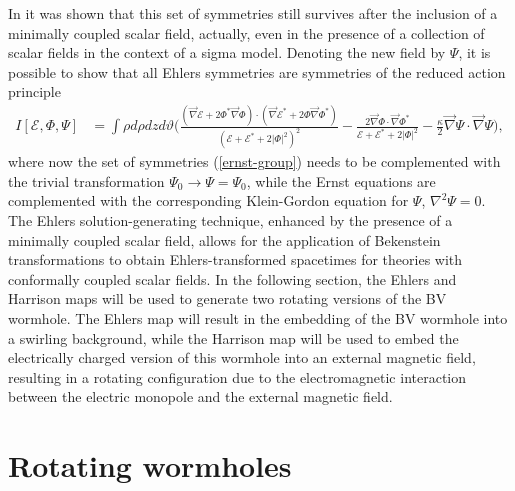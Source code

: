 \documentclass[aps,preprint,groupedaddress,nofootinbib,superscriptaddress,showkeys,showpacs,eqsecnum,amsmath,amssymb]{revtex4-1}
\newcommand{\ernst}{\mathcal{E}}
\begin{document}
In \cite{Astorino:2013xc} it was shown that this set of symmetries still survives after the inclusion of a minimally coupled scalar field, actually, even in the presence of a collection of scalar fields in the context of a sigma model. Denoting the new field by $\Psi$, it is possible to show that all Ehlers symmetries are symmetries of the reduced action principle 
\begin{align}
I[\ernst,\Phi,\Psi] &= \int \rho d\rho dz d\vartheta \Biggl(\frac{(\vec{\nabla}\ernst + 2 \Phi^{*} \vec{\nabla} \Phi ) \cdot (\vec{\nabla}\ernst^{*} + 2 \Phi \vec{\nabla} \Phi^{*} )}{(\ernst+ \ernst^{*} + 2 |\Phi|^2)^2}-\frac{2 \vec{\nabla}\Phi \cdot \vec{\nabla}\Phi^{*}}{\ernst + \ernst^{*} + 2 |\Phi|^2} -\frac{\kappa}{2} \vec{\nabla}\Psi \cdot \vec{\nabla} \Psi \Biggr) , \label{maxw-GR+MinScl-action}
\end{align}
where now the set of symmetries (\ref{ernst-group}) needs to be complemented with the trivial transformation $\Psi_0\rightarrow\Psi=\Psi_0$, while the Ernst equations are complemented with the corresponding Klein-Gordon equation for $\Psi$, $\nabla^2\Psi=0$. 
The Ehlers solution-generating technique, enhanced by the presence of a minimally coupled scalar field, allows for the application of Bekenstein transformations to obtain Ehlers-transformed spacetimes for theories with conformally coupled scalar fields. In the following section, the Ehlers and Harrison maps will be used to generate two rotating versions of the BV wormhole. The Ehlers map will result in the embedding of the BV wormhole into a swirling background, while the Harrison map will be used to embed the electrically charged version of this wormhole into an external magnetic field, resulting in a rotating configuration due to the electromagnetic interaction between the electric monopole and the external magnetic field.

\section{Rotating wormholes\label{sec:RotWH}}
\end{document}
